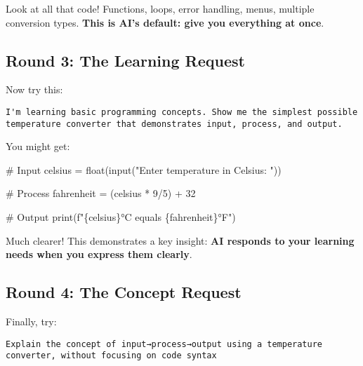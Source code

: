 \documentclass[
  letterpaper,
  DIV=11,
  numbers=noendperiod,
  oneside]{scrreprt}
\newenvironment{Shaded}{}{}
\newcommand{\BuiltInTok}[1]{\textcolor[rgb]{0.84,0.23,0.29}{#1}}
\newcommand{\CommentTok}[1]{\textcolor[rgb]{0.42,0.45,0.49}{#1}}
\newcommand{\DecValTok}[1]{\textcolor[rgb]{0.00,0.36,0.77}{#1}}
\newcommand{\NormalTok}[1]{\textcolor[rgb]{0.14,0.16,0.18}{#1}}
\newcommand{\OperatorTok}[1]{\textcolor[rgb]{0.14,0.16,0.18}{#1}}
\newcommand{\SpecialCharTok}[1]{\textcolor[rgb]{0.00,0.36,0.77}{#1}}
\newcommand{\SpecialStringTok}[1]{\textcolor[rgb]{0.01,0.18,0.38}{#1}}
\newcommand{\StringTok}[1]{\textcolor[rgb]{0.01,0.18,0.38}{#1}}
\begin{document}
Look at all that code! Functions, loops, error handling, menus, multiple
conversion types. \textbf{This is AI's default: give you everything at
once}.

\subsection{Round 3: The Learning
Request}\label{round-3-the-learning-request}

Now try this:

\begin{verbatim}
I'm learning basic programming concepts. Show me the simplest possible temperature converter that demonstrates input, process, and output.
\end{verbatim}

You might get:

\begin{Shaded}
\begin{Highlighting}[]
\CommentTok{\# Input}
\NormalTok{celsius }\OperatorTok{=} \BuiltInTok{float}\NormalTok{(}\BuiltInTok{input}\NormalTok{(}\StringTok{"Enter temperature in Celsius: "}\NormalTok{))}

\CommentTok{\# Process}
\NormalTok{fahrenheit }\OperatorTok{=}\NormalTok{ (celsius }\OperatorTok{*} \DecValTok{9}\OperatorTok{/}\DecValTok{5}\NormalTok{) }\OperatorTok{+} \DecValTok{32}

\CommentTok{\# Output}
\BuiltInTok{print}\NormalTok{(}\SpecialStringTok{f"}\SpecialCharTok{\{}\NormalTok{celsius}\SpecialCharTok{\}}\SpecialStringTok{°C equals }\SpecialCharTok{\{}\NormalTok{fahrenheit}\SpecialCharTok{\}}\SpecialStringTok{°F"}\NormalTok{)}
\end{Highlighting}
\end{Shaded}

Much clearer! This demonstrates a key insight: \textbf{AI responds to
your learning needs when you express them clearly}.

\subsection{Round 4: The Concept
Request}\label{round-4-the-concept-request}

Finally, try:

\begin{verbatim}
Explain the concept of input→process→output using a temperature converter, without focusing on code syntax
\end{verbatim}
\end{document}
